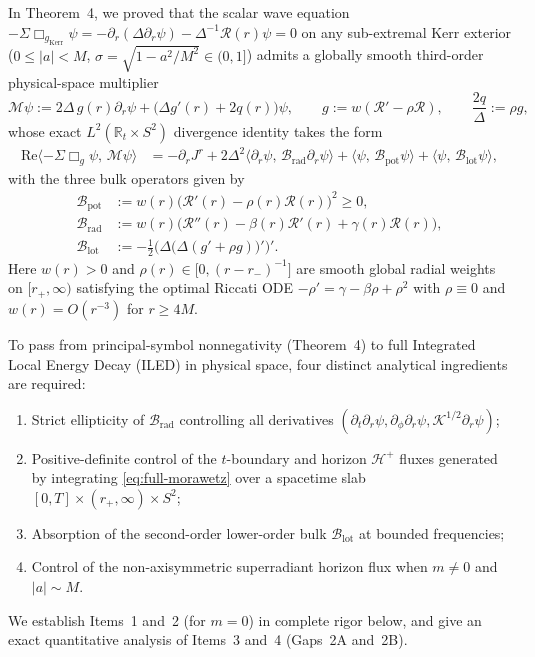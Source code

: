\documentclass[11pt, a4paper]{article}
\theoremstyle{remark}
\begin{document}
In Theorem~4, we proved that the scalar wave equation $-\Sigma\Box_{g_{\mathrm{Kerr}}}\psi = -\partial_r(\Delta\partial_r\psi) - \Delta^{-1}\mathcal{R}(r)\psi = 0$ on any sub-extremal Kerr exterior ($0 \le |a| < M$, $\sigma = \sqrt{1 - a^2/M^2} \in (0, 1]$) admits a globally smooth third-order physical-space multiplier
\begin{equation}
\mathcal{M}\psi := 2\Delta\, g(r)\partial_r\psi + \big(\Delta g'(r) + 2q(r)\big)\psi, \qquad g := w(\mathcal{R}' - \rho\mathcal{R}), \qquad \frac{2q}{\Delta} := \rho g,
\end{equation}
whose exact $L^2(\mathbb{R}_t \times S^2)$ divergence identity takes the form
\begin{align}
\label{eq:full-morawetz}
\mathrm{Re}\langle -\Sigma\Box_g\psi,\, \mathcal{M}\psi \rangle &= -\partial_r J^r + 2\Delta^2\langle \partial_r\psi,\, \mathcal{B}_{\mathrm{rad}}\partial_r\psi \rangle + \langle \psi,\, \mathcal{B}_{\mathrm{pot}}\psi \rangle + \langle \psi,\, \mathcal{B}_{\mathrm{lot}}\psi \rangle,
\end{align}
with the three bulk operators given by
\begin{align}
\mathcal{B}_{\mathrm{pot}} &:= w(r)\big(\mathcal{R}'(r) - \rho(r)\mathcal{R}(r)\big)^2 \ge 0, \\
\mathcal{B}_{\mathrm{rad}} &:= w(r)\big(\mathcal{R}''(r) - \beta(r)\mathcal{R}'(r) + \gamma(r)\mathcal{R}(r)\big), \\
\mathcal{B}_{\mathrm{lot}} &:= -\frac{1}{2}\Big(\Delta\big(\Delta(g' + \rho g)\big)'\Big)'.
\end{align}
Here $w(r) > 0$ and $\rho(r) \in \big[0, (r - r_-)^{-1}\big]$ are smooth global radial weights on $[r_+, \infty)$ satisfying the optimal Riccati ODE $-\rho' = \gamma - \beta\rho + \rho^2$ with $\rho \equiv 0$ and $w(r) = O(r^{-3})$ for $r \ge 4M$.

To pass from principal-symbol nonnegativity (Theorem~4) to full Integrated Local Energy Decay (ILED) in physical space, four distinct analytical ingredients are required:
\begin{enumerate}
\item Strict ellipticity of $\mathcal{B}_{\mathrm{rad}}$ controlling all derivatives $(\partial_t\partial_r\psi, \partial_\phi\partial_r\psi, \mathcal{K}^{1/2}\partial_r\psi)$;
\item Positive-definite control of the $t$-boundary and horizon $\mathcal{H}^+$ fluxes generated by integrating \eqref{eq:full-morawetz} over a spacetime slab $[0, T] \times (r_+, \infty) \times S^2$;
\item Absorption of the second-order lower-order bulk $\mathcal{B}_{\mathrm{lot}}$ at bounded frequencies;
\item Control of the non-axisymmetric superradiant horizon flux when $m \ne 0$ and $|a| \sim M$.
\end{enumerate}
We establish Items~1 and~2 (for $m = 0$) in complete rigor below, and give an exact quantitative analysis of Items~3 and~4 (Gaps~2A and~2B).
\end{document}
